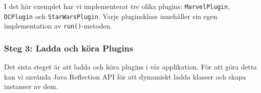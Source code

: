 \hypertarget{cb2}{}
\begin{Shaded}
\begin{Highlighting}[]
 \OperatorTok{\{}
  \OperatorTok{()} \OperatorTok{\{}
\OperatorTok{(}\OperatorTok{);}
\OperatorTok{\}}
\OperatorTok{\}}

 \OperatorTok{\{}
  \OperatorTok{()} \OperatorTok{\{}
\OperatorTok{(}\OperatorTok{);}
\OperatorTok{\}}
\OperatorTok{\}}

 \OperatorTok{\{}
  \OperatorTok{()} \OperatorTok{\{}
\OperatorTok{(}\OperatorTok{);}
\OperatorTok{\}}
\OperatorTok{\}}
\end{Highlighting}
\end{Shaded}

I det här exemplet har vi implementerat tre olika plugins:
\texttt{MarvelPlugin}, \texttt{DCPlugin} och \texttt{StarWarsPlugin}.
Varje pluginsklass innehåller sin egen implementation av
\texttt{run()}-metoden.

\hypertarget{steg-3-ladda-och-kuxf6ra-plugins}{%
\subsubsection{Steg 3: Ladda och köra
Plugins}\label{steg-3-ladda-och-kuxf6ra-plugins}}

Det sista steget är att ladda och köra plugins i vår applikation. För
att göra detta kan vi använda Java Reflection API för att dynamiskt
ladda klasser och skapa instanser av dem.

